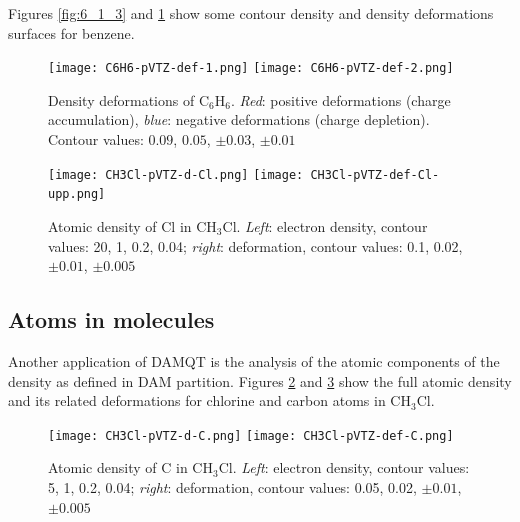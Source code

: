 \documentclass[10pt]{article}
\begin{document}
Figures \ref{fig:6_1_3} and \ref{fig:6_1_4} show some contour density and
density deformations surfaces for benzene.

\begin{figure}[H]
\begin{center}
\texttt{[image: C6H6-pVTZ-def-1.png]}
\hspace*{5mm}
\texttt{[image: C6H6-pVTZ-def-2.png]}
\vspace*{0.cm}
\end{center}
\caption[Density deformations of C$_6$H$_6$]{ Density deformations of C$_6$H$_6$. {\it Red}: positive deformations
(charge accumulation),
{\it blue}: negative deformations (charge depletion). Contour values:
$0.09$, $0.05$, $\pm 0.03$, $\pm 0.01$ \label{fig:6_1_4}}
\end{figure}



\begin{figure}[H]
\begin{center}
\texttt{[image: CH3Cl-pVTZ-d-Cl.png]}
\hspace*{5mm}
\texttt{[image: CH3Cl-pVTZ-def-Cl-upp.png]}
\end{center}
\caption[Atomic density of Cl in CH$_3$Cl]{ Atomic density of Cl in CH$_3$Cl. {\it Left}: electron density,
contour values: 20, 1, 0.2, 0.04; {\it right}: deformation, contour values:
0.1, 0.02, $\pm 0.01$, $\pm 0.005$
\label{fig:6_2_1}}
\end{figure}


\subsection{Atoms in molecules \label{sec:6.2}}

Another application of DAMQT is the analysis of the atomic components
of the density as defined in DAM partition. Figures \ref{fig:6_2_1} and
\ref{fig:6_2_2} show the full atomic density and its related deformations for
chlorine and carbon atoms in CH$_3$Cl.

\vspace*{5mm}
\begin{figure}[H]
\begin{center}
\texttt{[image: CH3Cl-pVTZ-d-C.png]}
\hspace*{5mm}
\texttt{[image: CH3Cl-pVTZ-def-C.png]}
\end{center}
\caption[Atomic density of C in CH$_3$Cl]{ Atomic density of C in CH$_3$Cl. {\it Left}: electron density,
contour values: 5, 1, 0.2, 0.04; {\it right}: deformation, contour values:
0.05, 0.02, $\pm 0.01$, $\pm 0.005$
\label{fig:6_2_2}}
\end{figure}
\end{document}
